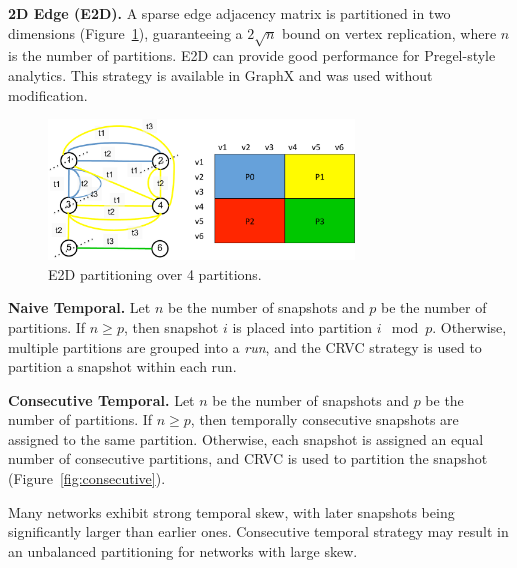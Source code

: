 {\bf 2D Edge (E2D).}  A sparse edge adjacency matrix is partitioned in
two dimensions (Figure~\ref{fig:e2d}), guaranteeing a $2 \sqrt{n}$
bound on vertex replication, where $n$ is the number of
partitions. E2D can provide good performance for Pregel-style
analytics.  This strategy is available in GraphX and was used without
modification.

\begin{figure}[t!]
\includegraphics[width=3.2in]{figs/E2D.pdf}
\caption{E2D partitioning over 4 partitions.}
\label{fig:e2d}
\end{figure}

{\bf Naive Temporal.} Let $n$ be the number of snapshots and $p$ be
the number of partitions.  If $n \geq p$, then snapshot $i$ is placed
into partition $i \mod p$.  Otherwise, multiple partitions are grouped
into a {\em run}, and the CRVC strategy is used to partition a
snapshot within each run.


{\bf Consecutive Temporal.}  Let $n$ be the number of snapshots and
$p$ be the number of partitions.  If $n \geq p$, then temporally
consecutive snapshots are assigned to the same partition.  Otherwise,
each snapshot is assigned an equal number of consecutive partitions,
and CRVC is used to partition the snapshot
(Figure~\ref{fig:consecutive}).


Many networks exhibit strong temporal skew, with later snapshots being
significantly larger than earlier ones.  Consecutive temporal strategy
may result in an unbalanced partitioning for networks with large skew.


